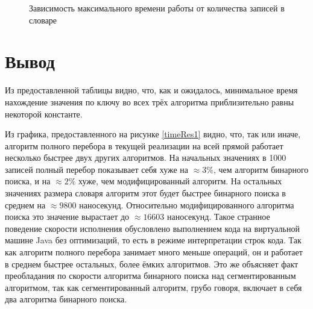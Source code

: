 \documentclass[12pt]{report}
\begin{document}
\begin{figure}[h]
\begin{center}
	\captionsetup{justification=centering}
	\caption{Зависимость максимального времени работы от количества записей в словаре}
	\label{timeRes2}
	\end{center}
\end{figure}

\newpage

\section*{Вывод}
Из предоставленной таблицы видно, что, как и ожидалось, минимальное время нахождение значения по ключу во всех трёх алгоритма приблизительно равны некоторой константе.

Из графика, предоставленного на рисунке \ref{timeRes1} видно, что, так или иначе, алгоритм полного перебора в текущей реализации на всей прямой работает несколько быстрее двух других алгоритмов. На начальных значениях в 1000 записей полный перебор показывает себя хуже на $\approx 3\%$, чем алгоритм бинарного поиска, и на $\approx 2\%$ хуже, чем модифицированный алгоритм. На остальных значениях размера словаря алгоритм этот будет быстрее бинарного поиска в среднем на $\approx 9800$ наносекунд. Относительно модифицированного алгоритма поиска это значение вырастает до $\approx 16603$ наносекунд. Такое странное поведение скорости исполнения обусловлено выполнением кода на виртуальной машине Java \cite{JVM} без оптимизаций, то есть в режиме интерпретации строк кода. Так как алгоритм полного перебора занимает много меньше операций, он и работает в среднем быстрее остальных, более ёмких алгоритмов. Это же объясняет факт преобладания по скорости алгоритма бинарного поиска над сегментированным алгоритмом, так как сегментированный алгоритм, грубо говоря, включает в себя два алгоритма бинарного поиска.
\end{document}

